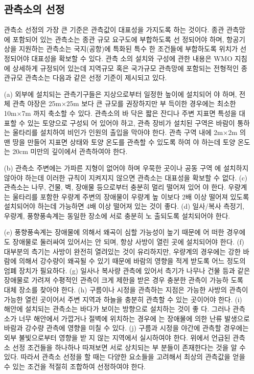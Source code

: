 \subsection{관측소의 선정}
관측소 선정의 가장 큰 기준은 관측값이 대표성을 가지도록 하는 것이다.
종관 관측망에 포함되어 있는 관측소는 종관 규모 요구도에 부합하도록 선
정되어야 하며, 항공기상을 지원하는 관측소는 국지(공항)에 특화된 특수
한 조건들에 부합하도록 위치가 선정되어야 대표성을 확보할 수 있다. 관측
소의 설치와 구성에 관한 내용은 WMO 지침에 상세하게 규정되어 있는데
지역규모 혹은 국가규모 관측망에 포함되는 전형적인 종관규모 관측소는
다음과 같은 선정 기준이 제시되고 있다.

(a) 외부에 설치되는 관측기구들은 지상으로부터 일정한 높이에 설치되어
야 하며, 전체 관측 야장은 25m×25m 보다 큰 규모를 권장하지만 부
득이한 경우에는 최소한 10m×7m 까지 축소할 수 있다. 관측소의 바
닥은 짧은 잔디나 주변 지표면 특성을 대표할 수 있는 토양으로 구성되
어 있어야 하고, 관측 장비가 설치된 구역은 바람이 통하는 울타리를
설치하여 비인가 인원의 출입을 막아야 한다. 관측 구역 내에 2m×2m
의 맨 땅을 만들어 지표면 상태와 토양 온도를 관측할 수 있도록 하여
야 하는데 토양 온도는 20cm 미만의 깊이에서 관측하여야 한다.

(b) 관측소 주변에는 가파른 지형이 없어야 하며 우묵한 곳이나 공동 구역
에 설치하지 않아야 하는데 이러한 규칙이 지켜지지 않으면 관측소는
대표성을 확보할 수 없다.
(c) 관측소는 나무, 건물, 벽, 장애물 등으로부터 충분히 멀리 떨어져 있어
야 한다. 우량계는 울타리를 포함한 우량계 주변의 장애물이 우량계 높
이보다 2배 이상 떨어져 있도록 설치되어야 하는데 가능하면 4배 이상
떨어져 있는 것이 좋다.
(d) 일사/복사 측정기, 우량계, 풍향풍속계는 동일한 장소에 서로 충분히 노
출되도록 설치되어야 한다.

(e) 풍향풍속계는 장애물에 의해서 왜곡이 심할 가능성이 높기 때문에 어
떠한 경우에도 장애물로 둘러싸여 있어서는 안 되며, 항상 사방이 열린
곳에 설치되어야 한다.
(f) 대부분의 측기는 사방이 완전히 열려있는 것이 유리하지만, 우량계의
경우에는 강한 바람에 의해서 강수량이 왜곡될 수 있기 때문에 바람의
영향을 적게 받도록 어느 정도의 엄폐 장치가 필요하다.
(g) 일사나 복사량 관측에 있어서 측기가 나무나 건물 등과 같은 장애물로
가려져 수평적인 관측이 크게 제한을 받은 경우 충분한 관측이 가능하
도록 대체 장소를 찾아야 한다.
(h) 구름이나 시정을 관측하는 지점은 가능한 사방의 관측이 가능한 열린
곳이어서 주변 지역과 하늘을 충분히 관측할 수 있는 곳이어야 한다.
(i) 해안에 설치되는 관측소는 바다가 보이는 방향으로 설치하는 것이 좋
다. 그러나 관측소가 너무 해안에서 가깝거나 절벽에 위치하는 경우에
는 장애물에 의한 난류 발생으로 바람과 강수량 관측에 영향을 미칠 수
있다.
(j) 구름과 시정을 야간에 관측할 경우에는 외부 불빛으로부터 영향을 받
지 않는 지역에서 실시하여야 한다.
위에서 언급된 관측소 선정 조건들을 하나하나 따져보면 서로 상치되는 부
분들이 존재한다는 것을 알 수 있다. 따라서 관측소 선정을 할 때는 다양한
요소들을 고려해서 최상의 관측값을 얻을 수 있는 조건을 적절히 조합하여
선정하여야 한다.

